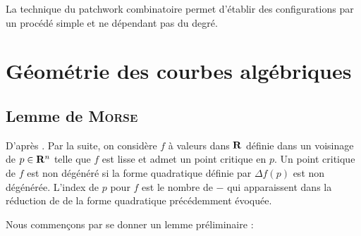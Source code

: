 \documentclass{livre}
\begin{document}
La technique du patchwork combinatoire permet d'établir des configurations par un procédé simple et ne dépendant pas du degré.

\mainmatter

\chapter{Géométrie des courbes algébriques}

\section{Lemme de \textsc{Morse}}

D'après \cite{Milnor1973}.
Par la suite, on considère $f$ à valeurs dans $\mathbf{R}$ définie dans un voisinage de $p\in \mathbf{R}^{n}$ telle que $f$ est lisse et admet un point critique en $p$. Un point critique de $f$ est non dégénéré si la forme quadratique définie par $\Delta f(p)$ est non dégénérée. L'index de $p$ pour $f$ est le nombre de $-$ qui apparaissent dans la réduction de  de la forme quadratique précédemment évoquée.

Nous commençons par se donner un lemme préliminaire :

\end{document}
